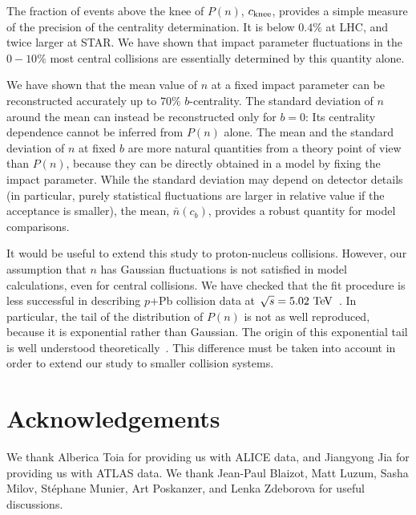 \documentclass[aps,prc,twocolumn,superscriptaddress,showpacs,floatfix,nofootinbib]{revtex4-1}
\begin{document}
The fraction of events above the knee of $P(n)$, $c_{\rm knee}$, provides a simple measure of the precision of the centrality determination.
It is below $0.4\%$ at LHC, and twice larger at STAR. 
We have shown that impact parameter fluctuations in the $0-10\%$ most central collisions are essentially determined by this quantity alone.

We have shown that the mean value of $n$ at a fixed impact parameter can be reconstructed accurately up to $70\%$ $b$-centrality.
The standard deviation of $n$ around the mean can instead be reconstructed only for $b=0$: Its centrality dependence cannot be inferred from $P(n)$ alone.  
The mean and the standard deviation of $n$ at fixed $b$ are more natural quantities from a theory point of view than $P(n)$, because they can be directly obtained in a model by fixing the impact parameter.  
While the standard deviation may depend on detector details (in particular, purely statistical fluctuations are larger in relative value if the acceptance is smaller), the mean, $\bar n (c_b)$, provides a robust quantity for model comparisons. 

It would be useful to extend this study to proton-nucleus collisions. 
However, our assumption that $n$ has Gaussian fluctuations is not satisfied in model calculations, even for central collisions. 
We have checked that the fit procedure is less successful in 
describing $p$+Pb collision data at $~\sqrt[]{s}=5.02~{\rm TeV}$~\cite{Adam:2014qja}. 
In particular, the tail of the distribution of $P(n)$ is not as well reproduced, because it is exponential rather than  Gaussian. 
The origin of this exponential tail is well understood theoretically~\cite{Liou:2016mfr}. 
This difference must be taken into account in order to extend our study to smaller collision systems. 


\section*{Acknowledgements}
We thank Alberica Toia for providing us with ALICE data, and Jiangyong Jia for providing us with ATLAS data. 
We thank Jean-Paul Blaizot, Matt Luzum, Sasha Milov, St\'ephane Munier, Art Poskanzer, and Lenka Zdeborova for useful discussions.
\end{document}
